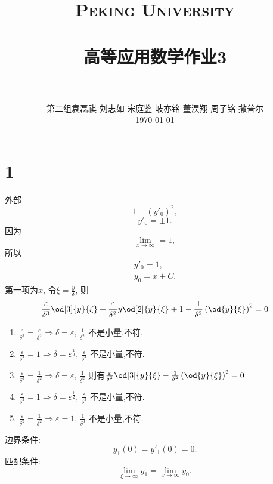 \documentclass[12pt]{article}
\title{
		\vspace{-1in} 	
		\usefont{OT1}{bch}{b}{n}
		\normalfont \normalsize \textsc{\LARGE Peking University}\\[1cm] %
		\horrule{0.5pt} \\[0.5cm]
		\huge \bfseries{高等应用数学作业3} \\
		\horrule{2pt} \\[0.5cm]
}
\author{
		\normalfont 								\normalsize
		第二组\quad 袁磊祺 \quad 刘志如 \quad 宋庭鉴 \quad 岐亦铭 \quad 董淏翔 \quad 周子铭 \quad 撒普尔\\	\normalsize
        \today
}
\date{}
\begin{document}


\maketitle

\section{1}

外部
\begin{equation}
	1 - (y'_0)^2,
\end{equation}
\begin{equation}
	y'_0 = \pm 1.
\end{equation}
因为
\begin{equation}
	\lim_{x\to \infty} = 1,
\end{equation}
所以
\begin{gather}
	y'_0 = 1,\\
	y_0 = x + C.
\end{gather}
第一项为$x$, 令$\xi = \frac{y}{\delta}$, 则
\begin{equation}
	\frac{\varepsilon}{\delta^3} \od[3]{y}{\xi} + \frac{\varepsilon}{\delta^2} y \od[2]{y}{\xi} + 1 - \frac{1}{\delta^2} \left(\od{y}{\xi}\right)^2 = 0
\end{equation}

\begin{enumerate}
	\item $\frac{\varepsilon}{\delta^3} = \frac{\varepsilon}{\delta^2} \Rightarrow \delta = \varepsilon$, $\frac{1}{\delta^2}$ 不是小量,不符.
	\item $\frac{\varepsilon}{\delta^3} = 1 \Rightarrow \delta = \varepsilon^{\frac{1}{3}}$, $\frac{\varepsilon}{\delta^2}$ 不是小量,不符.
	\item $\frac{\varepsilon}{\delta^3} = \frac{1}{\delta^2} \Rightarrow \delta = \varepsilon$, $\frac{1}{\delta^2}$ 则有$\frac{\varepsilon}{\delta^3} \od[3]{y}{\xi} - \frac{1}{\delta^2} \left(\od{y}{\xi}\right)^2 = 0$
	\item $\frac{\varepsilon}{\delta^2} = 1 \Rightarrow \delta = \varepsilon^{\frac{1}{2}}$, $\frac{\varepsilon}{\delta^3}$ 不是小量,不符.
	\item $\frac{\varepsilon}{\delta^2} = \frac{1}{\delta^2} \Rightarrow \varepsilon = 1$, $\frac{1}{\delta^3}$ 不是小量,不符.
\end{enumerate}
边界条件:
\begin{equation}
	y_1(0) = y'_1(0) = 0.
\end{equation}
匹配条件:
\begin{equation}
	\lim_{\xi \to \infty} y_1 = \lim_{x \to \infty} y_0.
\end{equation}
\end{document}
